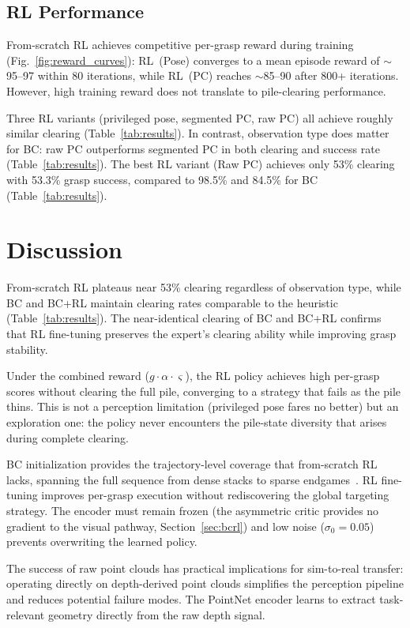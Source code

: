 \documentclass[conference]{IEEEtran}
\begin{document}
\subsection{RL Performance}
\label{sec:rl_perf}
From-scratch RL achieves competitive per-grasp reward during training (Fig.~\ref{fig:reward_curves}): RL~(Pose) converges to a mean episode reward of $\sim$95--97 within 80 iterations, while RL~(PC) reaches $\sim$85--90 after 800+ iterations.
However, high training reward does not translate to pile-clearing performance.

Three RL variants (privileged pose, segmented PC, raw PC) all achieve roughly similar clearing (Table~\ref{tab:results}).
In contrast, observation type does matter for BC: raw PC outperforms segmented PC in both clearing and success rate (Table~\ref{tab:results}).
The best RL variant (Raw PC) achieves only 53\% clearing with 53.3\% grasp success, compared to 98.5\% and 84.5\% for BC (Table~\ref{tab:results}).

\section{Discussion}

From-scratch RL plateaus near 53\% clearing regardless of observation type, while BC and BC+RL maintain clearing rates comparable to the heuristic (Table~\ref{tab:results}). The near-identical clearing of BC and BC+RL confirms that RL fine-tuning preserves the expert's clearing ability while improving grasp stability.

Under the combined reward ($g \cdot \alpha \cdot \varsigma$), the RL policy achieves high per-grasp scores without clearing the full pile, converging to a strategy that fails as the pile thins. This is not a perception limitation (privileged pose fares no better) but an exploration one: the policy never encounters the pile-state diversity that arises during complete clearing.

BC initialization provides the trajectory-level coverage that from-scratch RL lacks, spanning the full sequence from dense stacks to sparse endgames~\cite{rajeswaran2018learning}. RL fine-tuning improves per-grasp execution without rediscovering the global targeting strategy. The encoder must remain frozen (the asymmetric critic provides no gradient to the visual pathway, Section~\ref{sec:bcrl}) and low noise ($\sigma_0 = 0.05$) prevents overwriting the learned policy.

The success of raw point clouds has practical implications for sim-to-real transfer: operating directly on depth-derived point clouds simplifies the perception pipeline and reduces potential failure modes.
The PointNet encoder learns to extract task-relevant geometry directly from the raw depth signal.
\end{document}
